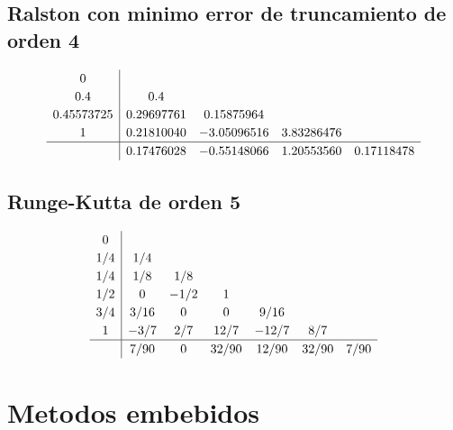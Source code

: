     \subsection{Ralston con minimo error de truncamiento de orden 4}
    \vspace{-10pt}
        \begin{equation}\label{eq:ralston4}
            \renewcommand\arraystretch{1.2}
            \begin{array}{c|cccc}
            0\\
            0.4 & 0.4\\
            0.45573725 & 0.29697761 & 0.15875964\\
            1 & 0.21810040 & -3.05096516 & 3.83286476\\
            \hline
            & 0.17476028 & -0.55148066 & 1.20553560 & 0.17118478
            \end{array}
        \end{equation}

    \subsection{Runge-Kutta de orden 5}
    \vspace{-10pt}
        \begin{equation}\label{eq:rk5}
            \renewcommand\arraystretch{1.2}
            \begin{array}{c|cccccc}
            0\\
            1/4 & 1/4\\
            1/4 & 1/8 & 1/8\\
            1/2 & 0 & -1/2 & 1\\
            3/4 & 3/16 & 0 & 0 & 9/16 \\
            1 & -3/7 & 2/7 & 12/7 & -12/7 & 8/7 \\
            \hline
            & 7/90 & 0 & 32/90 & 12/90 & 32/90 & 7/90
            \end{array}
        \end{equation}
    
    \vspace{-10pt}

    \section*{Metodos embebidos}
    
    \vfill
    
